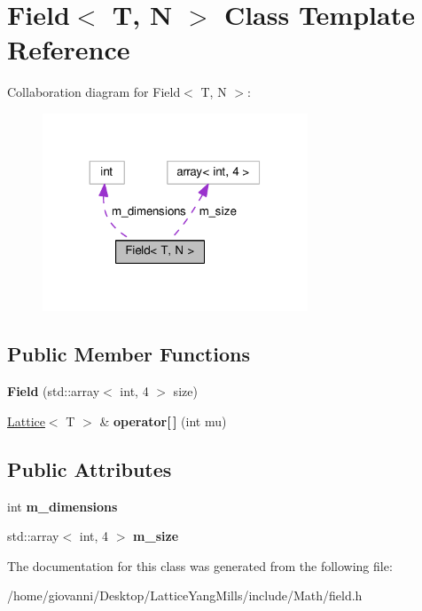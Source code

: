 \hypertarget{classField}{}\section{Field$<$ T, N $>$ Class Template Reference}
\label{classField}


Collaboration diagram for Field$<$ T, N $>$\+:
\nopagebreak
\begin{figure}[H]
\begin{center}
\leavevmode
\includegraphics[width=224pt]{classField__coll__graph}
\end{center}
\end{figure}
\subsection*{Public Member Functions}
\begin{DoxyCompactItemize}
\item 
{\bfseries Field} (std\+::array$<$ int, 4 $>$ size)\hypertarget{classField_a25a5869a0faa4d33782cbe9f277f684f}{}\label{classField_a25a5869a0faa4d33782cbe9f277f684f}

\item 
\hyperlink{classLattice}{Lattice}$<$ T $>$ \& {\bfseries operator\mbox{[}$\,$\mbox{]}} (int mu)\hypertarget{classField_a2c9ffced05a0a329395b2d9bca338840}{}\label{classField_a2c9ffced05a0a329395b2d9bca338840}

\end{DoxyCompactItemize}
\subsection*{Public Attributes}
\begin{DoxyCompactItemize}
\item 
int {\bfseries m\+\_\+dimensions}\hypertarget{classField_ada68c99dbc291529adcbc58c87273403}{}\label{classField_ada68c99dbc291529adcbc58c87273403}

\item 
std\+::array$<$ int, 4 $>$ {\bfseries m\+\_\+size}\hypertarget{classField_ae6a537c53432f6631a5e6eb624deea90}{}\label{classField_ae6a537c53432f6631a5e6eb624deea90}

\end{DoxyCompactItemize}


The documentation for this class was generated from the following file\+:\begin{DoxyCompactItemize}
\item 
/home/giovanni/\+Desktop/\+Lattice\+Yang\+Mills/include/\+Math/field.\+h\end{DoxyCompactItemize}
